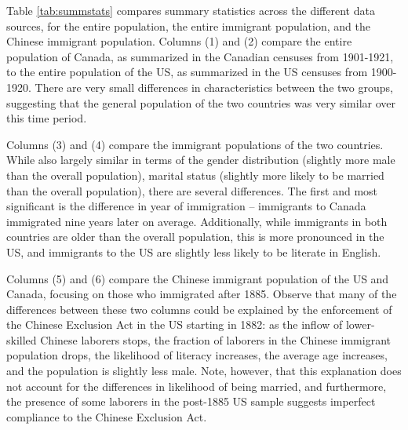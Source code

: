 Table \ref{tab:summstats} compares summary statistics across the different data sources, for the entire population, the entire immigrant population, and the Chinese immigrant population. Columns (1) and (2) compare the entire population of Canada, as summarized in the Canadian censuses from 1901-1921, to the entire population of the US, as summarized in the US censuses from 1900-1920. There are very small differences in characteristics between the two groups, suggesting that the general population of the two countries was very similar over this time period. 

Columns (3) and (4) compare the immigrant populations of the two countries. While also largely similar in terms of the gender distribution (slightly more male than the overall population), marital status (slightly more likely to be married than the overall population), there are several differences. The first and most significant is the difference in year of immigration -- immigrants to Canada immigrated nine years later on average. Additionally, while immigrants in both countries are older than the overall population, this is more pronounced in the US, and immigrants to the US are slightly less likely to be literate in English. 

Columns (5) and (6) compare the Chinese immigrant population of the US and Canada, focusing on those who immigrated after 1885. Observe that many of the differences between these two columns could be explained by the enforcement of the Chinese Exclusion Act in the US starting in 1882: as the inflow of lower-skilled Chinese laborers stops, the fraction of laborers in the Chinese immigrant population drops, the likelihood of literacy increases, the average age increases, and the population is slightly less male. Note, however, that this explanation does not account for the differences in likelihood of being married, and furthermore, the presence of some laborers in the post-1885 US sample suggests imperfect compliance to the Chinese Exclusion Act. 

